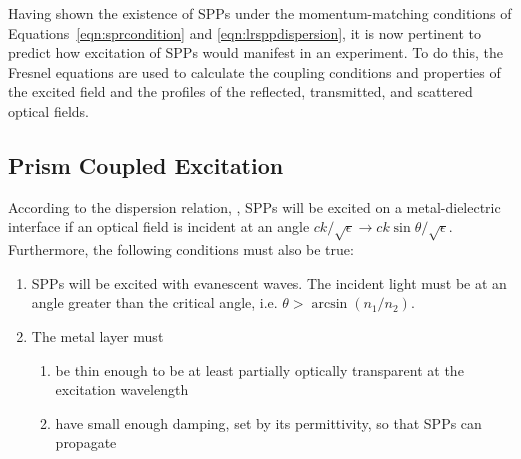 Having shown the existence of SPPs under the momentum-matching conditions of
Equations~\ref{eqn:sprcondition} and \ref{eqn:lrsppdispersion}, it is now
pertinent to predict how excitation of SPPs would manifest in an
experiment.  To do this, the Fresnel equations are used to calculate
the coupling conditions and properties of the excited field and the
profiles of the reflected, transmitted, and scattered optical fields.  


\subsection{Prism Coupled Excitation}
According to the dispersion relation, , 
SPPs will be excited on a
metal-dielectric interface if an optical field is incident at an angle 
$ck/\sqrt{\epsilon} \to ck\sin\theta/\sqrt{\epsilon}$.  Furthermore, the following
conditions must also be true:
\begin{enumerate}
\item SPPs will be excited with evanescent waves.  The
incident light must be at an angle greater than the critical angle, i.e.
$\theta>\arcsin\left(n_1/n_2\right)$.
\item The metal layer must
\begin{enumerate}
\item be thin enough to be at least partially optically transparent at the excitation wavelength
\item have small enough damping, set by its permittivity, so that SPPs can propagate
\end{enumerate}
\end{enumerate}

